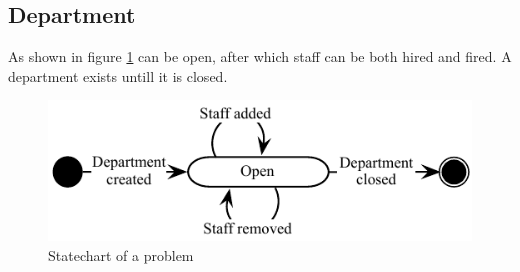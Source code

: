 \subsection{Department}
As shown in figure \ref{fig:Klasse_diagram_department} can be open, after which staff can be both hired and fired. A department exists untill it is closed.
\begin{figure}[H]
\begin{center}
\includegraphics[scale=1]{input/problem_domain_analysis/klassediagram_department.pdf}
\caption{Statechart of a problem}
\label{fig:Klasse_diagram_department}
\end{center}
\end{figure}